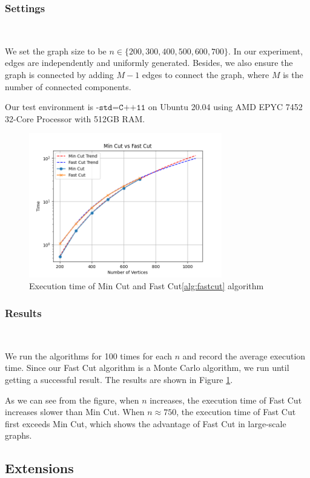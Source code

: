 \documentclass[12pt]{article}
\begin{document}
\subsubsection{Settings}\

We set the graph size to be $n\in\{200,300,400,500,600,700\}$. In our experiment, edges are independently and uniformly generated. Besides, we also ensure the graph is connected by adding $M-1$ edges to connect the graph, where $M$ is the number of connected components.

Our test environment is $\texttt{-std=C++11}$ on Ubuntu 20.04 using AMD EPYC 7452 32-Core Processor with 512GB RAM.


\begin{figure}[h]
    \centering
    \includegraphics[width=0.75\textwidth]{../MinCut/MinCut.png}
    \caption{Execution time of Min Cut and Fast Cut\ref{alg:fastcut} algorithm}
    \label{fig:mc}
\end{figure}

\subsubsection{Results}\

We run the algorithms for 100 times for each $n$ and record the average execution time. Since our Fast Cut algorithm is a Monte Carlo algorithm, we run until getting a successful result.  The results are shown in Figure \ref{fig:mc}.

As we can see from the figure, when $n$ increases, the execution time of Fast Cut increases slower than Min Cut. When $n\approx 750$, the execution time of Fast Cut first exceeds Min Cut, which shows the advantage of Fast Cut in large-scale graphs.

\subsection{Extensions}
\end{document}

